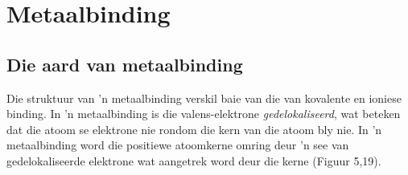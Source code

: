   \label{m38684**end}
         \section{Metaalbinding}
    \nopagebreak


            \subsection*{Die aard van metaalbinding}
            \nopagebreak
Die struktuur van  'n metaalbinding verskil baie van die van kovalente en ioniese binding. In  'n metaalbinding is die valens-elektrone \textsl{gedelokaliseerd}, wat beteken dat die atoom se elektrone nie rondom die kern van die atoom bly nie. In  'n metaalbinding word die positiewe atoomkerne omring deur  'n see van gedelokaliseerde elektrone wat aangetrek word deur die kerne (Figuur 5,19).\\ 



